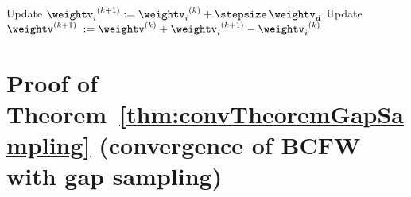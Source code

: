 \documentclass{article}
\begin{document}
\begin{algorithm}[t]
\begin{algorithmic}[1]
		  		\ENDIF \label{alg:aFW_product_SVM_endA}
                \STATE Update ${\weightv_i}^{(k+1)}:= {\weightv_i}^{(k)}+\stepsize \,\weightv_{\bm{d}}$
                \STATE Update $\weightv^{(k+1)}\;:= \weightv^{(k)} + {\weightv_i}^{(k+1)} - {\weightv_i}^{(k)}$
        \ENDFOR
\end{algorithmic}
\end{algorithm}


\section{Proof of Theorem~\ref{thm:convTheoremGapSampling} (convergence of BCFW with gap sampling) \label{app:proof_gap_sampling}}
\end{document}
